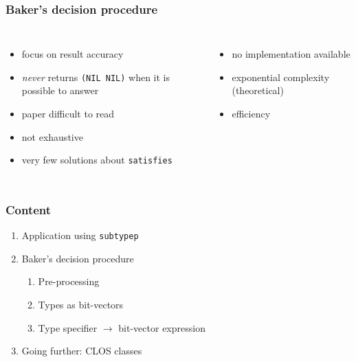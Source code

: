 \documentclass[aspectratio=169]{beamer}
\renewcommand\code[1]{\texttt{#1}}
\newcommand\rarr{\ensuremath{\rightarrow}}
\newcommand\plus{{\color{watchOS-blue}\faPlus}}
\newcommand\minus{{\color{watchOS-red}\faMinus}}
\newcommand\maybe{{\color{watchOS-purple}\faQuestion}}
\begin{document}
\begin{frame}
  \frametitle{Baker's decision procedure}
  \begin{columns}
    \column{.45\paperwidth}
    \begin{itemize}
    \item[\plus] focus on result accuracy
    \item[\plus] \emph{never} returns \code{(NIL NIL)} when it is possible to
      answer
      \pause
    \item[\minus] paper difficult to read
    \item[\minus] not exhaustive
    \item[\minus] very few solutions about \code{satisfies}
    \end{itemize}

    \pause
    \column{.45\paperwidth}
    \begin{itemize}
    \item[\minus] no implementation available
    \item[\minus] exponential complexity (theoretical)
    \item[\maybe] efficiency%
    \end{itemize}
  \end{columns}
\end{frame}

\begin{frame}
  \frametitle{Content}
  \begin{enumerate}
    \bf
    \setlength\itemsep{1em}
  \item Application using \code{subtypep}
  \item Baker's decision procedure
    \begin{enumerate}
      \setlength\itemsep{1em}
      \it
    \item Pre-processing
    \item Types as bit-vectors
    \item Type specifier \rarr{} bit-vector expression
    \end{enumerate}
  \item Going further: CLOS classes
  \end{enumerate}
\end{frame}

\end{document}
